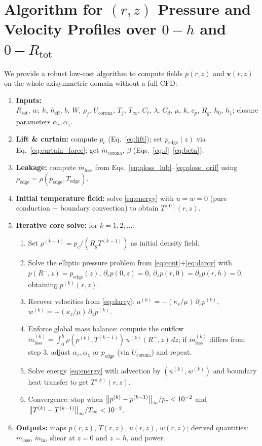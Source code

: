 \documentclass[11pt,a4paper]{article}
\begin{document}
\section{Algorithm for $(r,z)$ Pressure and Velocity Profiles over $0\!-\!h$ and $0\!-\!R_{\text{tot}}$}
We provide a robust low-cost algorithm to compute fields $p(r,z)$ and $\mathbf{v}(r,z)$ on the whole axisymmetric domain without a full CFD:
\begin{enumerate}
  \item \textbf{Inputs:} $R_{\text{tot}},\,w,\,h,\,h_{\mathrm{eff}},\,b,\,W,\,\rho_j,\,U_{\mathrm{corona}},\,T_j,\,T_\infty,\,C_t,\,\lambda,\,C_d,\,\mu,\,k,\,c_p,\,R_g,\,h_0,\,h_1$; closure parameters $\alpha_r,\alpha_z$.
  \item \textbf{Lift \& curtain:} compute $p_c$ (Eq.~\eqref{eq:lift}); set $p_\mathrm{edge}(z)$ via Eq.~\eqref{eq:curtain_force}; get $\dot m_{\mathrm{corona}}$, $\beta$ (Eqs.~\eqref{eq:J}--\eqref{eq:beta}).
  \item \textbf{Leakage:} compute $\dot m_{\mathrm{loss}}$ from Eqs.~\eqref{eq:qloss_lub}--\eqref{eq:qloss_orif} using $\rho_\mathrm{edge}=\rho(p_\mathrm{edge},T_\mathrm{edge})$.
  \item \textbf{Initial temperature field:} solve \eqref{eq:energy} with $u=w=0$ (pure conduction + boundary convection) to obtain $T^{(0)}(r,z)$.
  \item \textbf{Iterative core solve:} for $k=1,2,\dots$:
  \begin{enumerate}
    \item Set $\rho^{(k-1)}=p_c/(R_g T^{(k-1)})$ as initial density field.
    \item Solve the elliptic pressure problem from \eqref{eq:cont}+\eqref{eq:darcy} with $p(R^-,z)=p_\mathrm{edge}(z)$, $\partial_r p(0,z)=0$, $\partial_z p(r,0)=\partial_z p(r,h)=0$, obtaining $p^{(k)}(r,z)$.
    \item Recover velocities from \eqref{eq:darcy}: $u^{(k)}=-(\kappa_r/\mu)\,\partial_r p^{(k)}$, $w^{(k)}=-(\kappa_z/\mu)\,\partial_z p^{(k)}$.
    \item Enforce global mass balance: compute the outflow $\dot m_{\mathrm{loss}}^{(k)}=\int_0^h \rho(p^{(k)},T^{(k-1)})\,u^{(k)}(R^-,z)\,dz$; if $\dot m_{\mathrm{loss}}^{(k)}$ differs from step 3, adjust $\alpha_r,\alpha_z$ or $p_\mathrm{edge}$ (via $U_{\mathrm{corona}}$) and repeat.
    \item Solve energy \eqref{eq:energy} with advection by $(u^{(k)},w^{(k)})$ and boundary heat transfer to get $T^{(k)}(r,z)$.
    \item Convergence: stop when $\norm{p^{(k)}-p^{(k-1)}}_\infty/p_c<10^{-2}$ and $\norm{T^{(k)}-T^{(k-1)}}_\infty/T_\infty<10^{-2}$.
  \end{enumerate}
  \item \textbf{Outputs:} maps $p(r,z)$, $T(r,z)$, $u(r,z)$, $w(r,z)$; derived quantities: $\dot m_{\mathrm{loss}}$, $\dot m_{\mathrm{in}}$, shear at $z=0$ and $z=h$, and power.
\end{enumerate}
\end{document}
